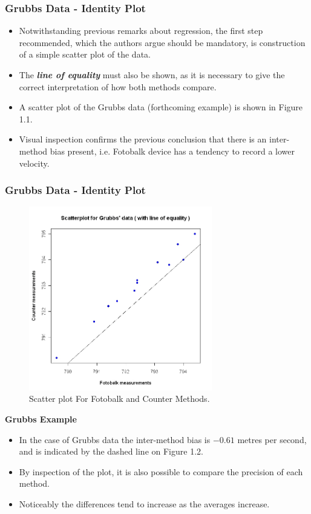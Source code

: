 \documentclass[compress]{beamer}        %
\begin{document}
\begin{frame}
\frametitle{Grubbs Data - Identity Plot}
\large
\begin{itemize}
\item Notwithstanding previous remarks about regression, the first step
recommended, which the authors argue should be mandatory, is
construction of a simple scatter plot of the data. 
\item The \textbf{\textit{line of
equality}} must also be shown, as it is necessary to give the
correct interpretation of how both methods compare. 
\item A scatter plot
of the Grubbs data (forthcoming example) is shown in Figure 1.1. 
\item Visual inspection confirms the previous conclusion that there is an
inter-method bias present, i.e. Fotobalk device has a tendency to
record a lower velocity.
\end{itemize}
\end{frame}
\begin{frame}
\frametitle{Grubbs Data - Identity Plot}
\begin{figure}[h!]
\begin{center}
  \includegraphics[width=80mm]{GrubbsScatter.jpeg}
  \caption{Scatter plot For Fotobalk and Counter Methods.}\label{GrubbsScatter}
\end{center}
\end{figure}
\end{frame}


\begin{frame}
\large
\textbf{Grubbs Example}
\begin{itemize}
\item 
In the case of Grubbs data the inter-method bias is
$-0.61$ metres per second, and is indicated by the dashed line on
Figure 1.2. 
\item By inspection of the plot, it is also possible to
compare the precision of each method. 
\item Noticeably the differences
tend to increase as the averages increase.
\end{itemize}
\end{frame}
\end{document}
